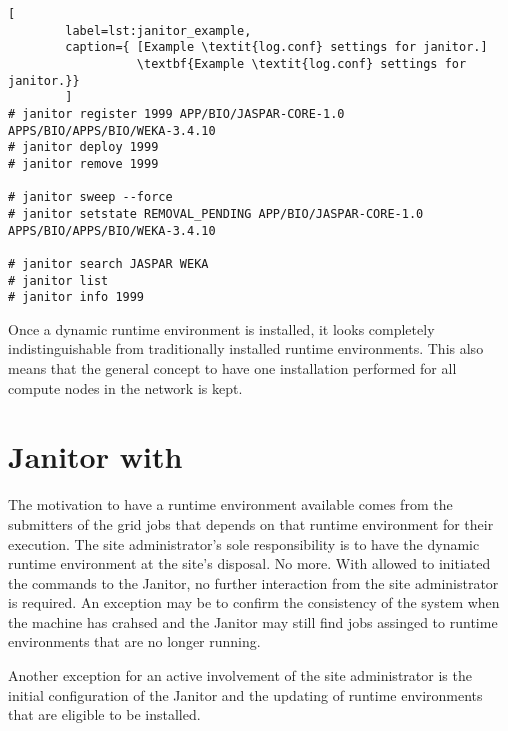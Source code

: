 \begin{lstlisting}[
        label=lst:janitor_example,
        caption={ [Example \textit{log.conf} settings for janitor.]
                  \textbf{Example \textit{log.conf} settings for janitor.}}
        ]
# janitor register 1999 APP/BIO/JASPAR-CORE-1.0 APPS/BIO/APPS/BIO/WEKA-3.4.10
# janitor deploy 1999
# janitor remove 1999

# janitor sweep --force
# janitor setstate REMOVAL_PENDING APP/BIO/JASPAR-CORE-1.0 APPS/BIO/APPS/BIO/WEKA-3.4.10

# janitor search JASPAR WEKA
# janitor list
# janitor info 1999
\end{lstlisting}

Once a dynamic runtime environment is installed, it looks completely
indistinguishable from traditionally installed runtime environments. This
also means that the general concept to have one installation performed
for all compute nodes in the network is kept.

% 
% 



% 
% 

\section{Janitor with \AREX}

The motivation to have a runtime environment available comes from the submitters
of the grid jobs that depends on that runtime environment for their execution.
The site administrator's sole responsibility is to have the dynamic runtime
environment at the site's disposal. No more. With \AREX allowed to initiated
the commands to the Janitor, no further interaction from the site administrator
is required. An exception may be to confirm the consistency of the system when
the machine has crahsed and the Janitor may still find jobs assinged to runtime
environments that are no longer running.

Another exception for an active involvement of the site administrator is the
initial configuration of the Janitor and the updating of runtime environments
that are eligible to be installed.
